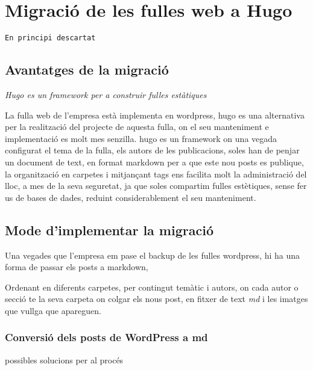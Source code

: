 \documentclass[
  10pt,
]{book}
\begin{document}
\hypertarget{migraciuxf3-de-les-fulles-web-a-hugo}{%
\chapter{Migració de les fulles web a Hugo}\label{migraciuxf3-de-les-fulles-web-a-hugo}}

\texttt{En\ principi\ descartat}

\hypertarget{avantatges-de-la-migraciuxf3}{%
\section{Avantatges de la migració}\label{avantatges-de-la-migraciuxf3}}

\emph{Hugo es un framework per a construir fulles estàtiques}

La fulla web de l'empresa està implementa en wordpress, hugo es una alternativa per la realització del projecte de aquesta fulla, on el seu manteniment e implementació es molt mes senzilla. hugo es un framework on una vegada configurat el tema de la fulla, els autors de les publicacions, soles han de penjar un document de text, en format markdown per a que este nou posts es publique, la organització en carpetes i mitjançant tags ens facilita molt la administració del lloc, a mes de la seva seguretat, ja que soles compartim fulles estètiques, sense fer us de bases de dades, reduint considerablement el seu manteniment.

\hypertarget{mode-dimplementar-la-migraciuxf3}{%
\section{Mode d'implementar la migració}\label{mode-dimplementar-la-migraciuxf3}}

Una vegades que l'empresa em pase el backup de les fulles wordpress, hi ha una forma de passar els posts a markdown,

Ordenant en diferents carpetes, per contingut temàtic i autors, on cada autor o secció te la seva carpeta on colgar els nous post, en fitxer de text \emph{md} i les imatges que vullga que apareguen.

\hypertarget{conversiuxf3-dels-posts-de-wordpress-a-md}{%
\subsection{Conversió dels posts de WordPress a md}\label{conversiuxf3-dels-posts-de-wordpress-a-md}}

possibles solucions per al procés
\end{document}
